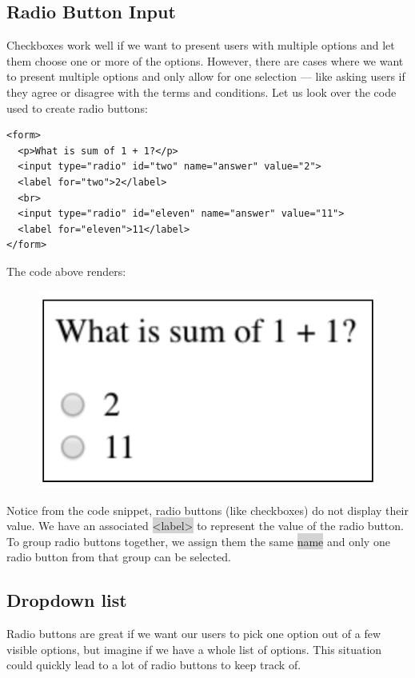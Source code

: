 \documentclass[11pt]{article}
\begin{document}
\subsection{Radio Button Input}
Checkboxes work well if we want to present users with multiple options and let them choose one or more of the options. However, there are cases where we want to present multiple options and only allow for one selection — like asking users if they agree or disagree with the terms and conditions. Let us look over the code used to create radio buttons:
\begin{lstlisting}
<form>
  <p>What is sum of 1 + 1?</p>
  <input type="radio" id="two" name="answer" value="2">
  <label for="two">2</label>
  <br>
  <input type="radio" id="eleven" name="answer" value="11">
  <label for="eleven">11</label>
</form>
\end{lstlisting}
The code above renders:
\begin{figure}[H]
\includegraphics[scale = 0.5]{3_10}
\centering
\end{figure}
\vspace{-4mm}
Notice from the code snippet, radio buttons (like checkboxes) do not display their value. We have an associated \colorbox{lightgray}{<label>} to represent the value of the radio button. To group radio buttons together, we assign them the same \colorbox{lightgray}{name} and only one radio button from that group can be selected.

\subsection{Dropdown list}
Radio buttons are great if we want our users to pick one option out of a few visible options, but imagine if we have a whole list of options. This situation could quickly lead to a lot of radio buttons to keep track of. 
\end{document}
